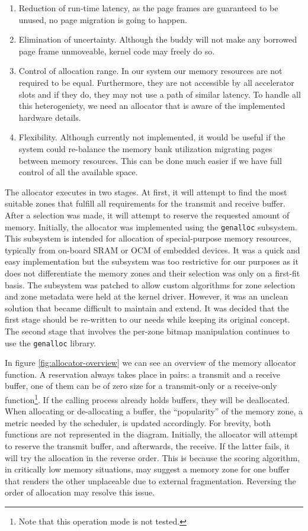 \begin{enumerate}
\item	Reduction of run-time latency, as the page frames are guaranteed to be unused,
	no page migration is going to happen.
\item	Elimination of uncertainty. Although the \gls{buddy} will not make any
	borrowed page frame unmoveable, kernel code may freely do so.
\item	Control of allocation range. In our system our memory resources are not
	required to be equal. Furthermore, they are not accessible by all 
	accelerator slots and if they do, they may not use a path of similar latency.
	To handle all this heterogeniety, we need an allocator that is aware
	of the implemented hardware details.
\item	Flexibility. Although currently not implemented, it would be useful if
	the system could re-balance the memory bank utilization migrating pages
	between memory resources. This can be done much easier if we have full
	control of all the available space.
\end{enumerate}

The allocator executes in two stages. At first, it will attempt to find the most suitable zones that
fulfill all requirements for the transmit and receive buffer. After a selection was made, it will
attempt to reserve the requested amount of memory. Initially, the allocator was implemented
using the \texttt{genalloc} subsystem. This subsystem is intended for allocation of special-purpose
memory resources, typically from on-board SRAM or OCM of embedded devices. 
It was a quick and easy implementation but the subsystem was too restrictive for our purposes as
it does not differentiate the memory zones and their selection was only on a first-fit basis.
The subsystem was patched to allow custom algorithms for zone selection and zone metadata were held
at the kernel driver. However, it was an unclean solution that became difficult to maintain and extend.
It was decided that the first stage should be re-written to our needs while keeping its original concept.
The second stage that involves the per-zone bitmap manipulation continues to use the \texttt{genalloc}
library.

In figure \ref{fig:allocator-overview} we can see an overview of the memory allocator function.
A reservation always takes place in pairs: a transmit and a receive buffer, one of them can be of zero size
for a transmit-only or a receive-only function\footnote{Note that this operation mode is not tested.}.
If the calling process already holds buffers, they will be deallocated. When allocating or de-allocating
a buffer, the ``popularity'' of the memory zone, a metric needed by the scheduler, is updated accordingly.
For brevity, both functions are not represented in the diagram. Initially, the allocator will attempt
to reserve the transmit buffer, and afterwards, the receive. If the latter fails, it will try the allocation
in the reverse order. This is because the scoring algorithm, in critically low memory situations, may suggest a
memory zone for one buffer that renders the other unplaceable due to external fragmentation. Reversing the order
of allocation may resolve this issue.

